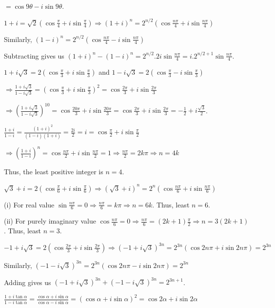   $= \cos9\theta - i\sin9\theta$.
\item $1 + i = \sqrt{2}\left(\cos\frac{\pi}{4} + i\sin\frac{\pi}{4}\right) \Rightarrow (1 + i)^n =
  2^{n/2}\left(\cos\frac{n\pi}{4} + i\sin\frac{n\pi}{4}\right)$

  Similarly, $(1 - i)^n = 2^{n/2}\left(\cos\frac{n\pi}{4} - i\sin\frac{n\pi}{4}\right)$

  Subtracting gives us $(1 + i)^n - (1 - i)^n = 2^{n/2}.2i\sin\frac{n\pi}{4} = i.2^{n/2 +
    1}\sin\frac{n\pi}{4}$.
\item $1 + i\sqrt{3} = 2\left(\cos\frac{\pi}{3} + i\sin\frac{\pi}{3}\right)$ and $1 - i\sqrt{3} =
  2\left(\cos\frac{\pi}{3} - i\sin\frac{\pi}{3}\right)$

  $\Rightarrow \frac{1 + i\sqrt{3}}{1 - i\sqrt{3}} = \left(\cos\frac{\pi}{3} + i\sin\frac{\pi}{3}\right)^2 =
  \cos\frac{2\pi}{3} + i\sin\frac{2\pi}{3}$

  $\Rightarrow \left(\frac{1 + i\sqrt{3}}{1 - i\sqrt{3}}\right)^{10} = \cos\frac{20\pi}{3} +
  i\sin\frac{20\pi}{3} = \cos\frac{2\pi}{3} + i\sin\frac{2\pi}{3} = -\frac{1}{2} + i\frac{\sqrt{3}}{2}$.
\item $\frac{1 + i}{1 - i} = \frac{(1 + i)^2}{(1 - i)(1 + i)} = \frac{2i}{2} = i = \cos\frac{\pi}{2} +
  i\sin\frac{\pi}{2}$

  $\Rightarrow \left(\frac{1 + i}{1 - i}\right)^n = \cos\frac{n\pi}{2} + i\sin\frac{n\pi}{2} = 1
  \Rightarrow \frac{n\pi}{2} = 2k\pi \Rightarrow n = 4k$

  Thus, the least positive integer is $n = 4$.
\item $\sqrt{3} + i = 2\left(\cos\frac{\pi}{6} + i\sin\frac{\pi}{6}\right) \Rightarrow (\sqrt{3} + i)^n =
  2^n\left(\cos\frac{n\pi}{6} + i\sin\frac{n\pi}{6}\right)$

  (i) For real value $\sin\frac{n\pi}{6} = 0 \Rightarrow \frac{n\pi}{6} = k\pi \Rightarrow n = 6k$. Thus,
  least $n = 6$.

  (ii) For purely imaginary value $\cos\frac{n\pi}{6} = 0 \Rightarrow \frac{n\pi}{6} = (2k + 1)\frac{\pi}{2}
  \Rightarrow n = 3(2k + 1)$. Thus, least $n = 3$.
\item $-1 + i\sqrt{3} = 2\left(\cos\frac{2\pi}{3} + i\sin\frac{2\pi}{3}\right) \Rightarrow (-1 +
  i\sqrt{3})^{3n} = 2^{3n}(\cos2n\pi + i\sin2n\pi) = 2^{3n}$

  Similarly, $(-1 - i\sqrt{3})^{3n} = 2^{3n}(\cos2n\pi - i\sin2n\pi) = 2^{3n}$

  Adding gives us $(-1 + i\sqrt{3})^{3n} + (-1 - i\sqrt{3})^{3n} = 2^{3n + 1}$.
\item $\frac{1 + i\tan\alpha}{1 - i\tan\alpha} = \frac{\cos\alpha + i\sin\alpha}{\cos\alpha - i\sin\alpha} =
  (\cos\alpha + i\sin\alpha)^2 = \cos2\alpha + i\sin2\alpha$

